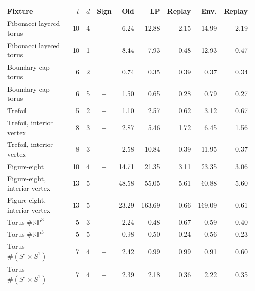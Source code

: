 \begin{tabularx}{\textwidth}{@{}Xrrcrrrrr@{}}
\toprule
Fixture & $t$ & $d$ & Sign & Old & LP & Replay & Env. & Replay \\
\midrule
Fibonacci layered torus & 10 & 4 & $-$ & 6.24 & 12.88 & 2.15 & 14.99 & 2.19 \\
Fibonacci layered torus & 10 & 1 & + & 8.44 & 7.93 & 0.48 & 12.93 & 0.47 \\
Boundary-cap torus & 6 & 2 & $-$ & 0.74 & 0.35 & 0.39 & 0.37 & 0.34 \\
Boundary-cap torus & 6 & 5 & + & 1.50 & 0.65 & 0.28 & 0.79 & 0.27 \\
Trefoil & 5 & 2 & $-$ & 1.10 & 2.57 & 0.62 & 3.12 & 0.67 \\
Trefoil, interior vertex & 8 & 3 & $-$ & 2.87 & 5.46 & 1.72 & 6.45 & 1.56 \\
Trefoil, interior vertex & 8 & 3 & + & 2.58 & 10.84 & 0.39 & 11.95 & 0.37 \\
Figure-eight & 10 & 4 & $-$ & 14.71 & 21.35 & 3.11 & 23.35 & 3.06 \\
Figure-eight, interior vertex & 13 & 5 & $-$ & 48.58 & 55.05 & 5.61 & 60.88 & 5.60 \\
Figure-eight, interior vertex & 13 & 5 & + & 23.29 & 163.69 & 0.66 & 169.09 & 0.61 \\
Torus $\#\mathbb{RP}^3$ & 5 & 3 & $-$ & 2.24 & 0.48 & 0.67 & 0.59 & 0.40 \\
Torus $\#\mathbb{RP}^3$ & 5 & 5 & + & 0.98 & 0.50 & 0.24 & 0.56 & 0.23 \\
Torus $\#(S^2\!\times S^1)$ & 7 & 4 & $-$ & 2.42 & 0.99 & 0.99 & 0.91 & 0.60 \\
Torus $\#(S^2\!\times S^1)$ & 7 & 4 & + & 2.39 & 2.18 & 0.36 & 2.22 & 0.35 \\
\bottomrule
\end{tabularx}

